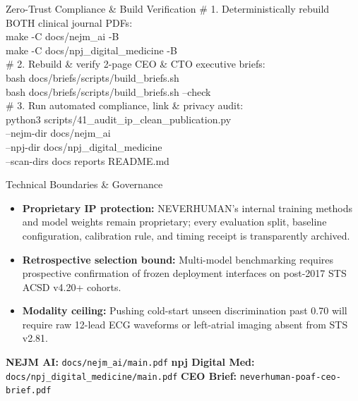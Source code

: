 \documentclass[10pt,letterpaper]{article}
\begin{document}
\begin{minipage}[t]{0.486\textwidth}
  \vspace{0pt}
  \begin{codecard}{Zero-Trust Compliance \& Build Verification}
{\color{codecomment}\# 1. Deterministically rebuild BOTH clinical journal PDFs:}\\
make -C docs/nejm\_ai -B\\
make -C docs/npj\_digital\_medicine -B\\[2.5pt]
{\color{codecomment}\# 2. Rebuild \& verify 2-page CEO \& CTO executive briefs:}\\
bash docs/briefs/scripts/build\_briefs.sh\\
bash docs/briefs/scripts/build\_briefs.sh --check\\[2.5pt]
{\color{codecomment}\# 3. Run automated compliance, link \& privacy audit:}\\
python3 scripts/41\_audit\_ip\_clean\_publication.py \\
  --nejm-dir docs/nejm\_ai \\
  --npj-dir docs/npj\_digital\_medicine \\
  --scan-dirs docs reports README.md
  \end{codecard}

  \vspace{2.5pt}
  \begin{govbox}{Technical Boundaries \& Governance}
    \begin{itemize}[leftmargin=1.10em,itemsep=1.5pt,topsep=1.2pt]
      \item \textbf{Proprietary IP protection:} NEVERHUMAN's internal training methods and model weights remain proprietary; every evaluation split, baseline configuration, calibration rule, and timing receipt is transparently archived.
      \item \textbf{Retrospective selection bound:} Multi-model benchmarking requires prospective confirmation of frozen deployment interfaces on post-2017 STS ACSD v4.20+ cohorts.
      \item \textbf{Modality ceiling:} Pushing cold-start unseen discrimination past 0.70 will require raw 12-lead ECG waveforms or left-atrial imaging absent from STS v2.81.
    \end{itemize}
  \end{govbox}
\end{minipage}

%
  {\textbf{NEJM AI:} \texttt{docs/nejm\_ai/main.pdf} \;\textbar\; \textbf{npj Digital Med:} \texttt{docs/npj\_digital\_medicine/main.pdf} \;\textbar\; \textbf{CEO Brief:} \texttt{neverhuman-poaf-ceo-brief.pdf}}%
  {\repourl}
\end{document}

